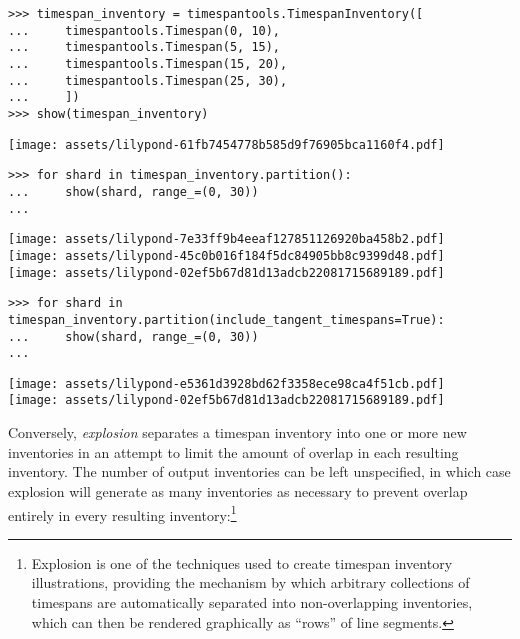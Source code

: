 \begin{abjadbookoutput}
\begin{singlespacing}
\vspace{-0.5\baselineskip}
\begin{lstlisting}
>>> timespan_inventory = timespantools.TimespanInventory([
...     timespantools.Timespan(0, 10),
...     timespantools.Timespan(5, 15),
...     timespantools.Timespan(15, 20),
...     timespantools.Timespan(25, 30),
...     ])
>>> show(timespan_inventory)
\end{lstlisting}
\noindent\texttt{[image: assets/lilypond-61fb7454778b585d9f76905bca1160f4.pdf]}
\begin{lstlisting}
>>> for shard in timespan_inventory.partition():
...     show(shard, range_=(0, 30))
...
\end{lstlisting}
\noindent\texttt{[image: assets/lilypond-7e33ff9b4eeaf127851126920ba458b2.pdf]}\\
\noindent\texttt{[image: assets/lilypond-45c0b016f184f5dc84905bb8c9399d48.pdf]}\\
\noindent\texttt{[image: assets/lilypond-02ef5b67d81d13adcb22081715689189.pdf]}
\begin{lstlisting}
>>> for shard in timespan_inventory.partition(include_tangent_timespans=True):
...     show(shard, range_=(0, 30))
...
\end{lstlisting}
\noindent\texttt{[image: assets/lilypond-e5361d3928bd62f3358ece98ca4f51cb.pdf]}\\
\noindent\texttt{[image: assets/lilypond-02ef5b67d81d13adcb22081715689189.pdf]}
\end{singlespacing}
\end{abjadbookoutput}

\noindent Conversely, \emph{explosion} separates a timespan inventory into one
or more new inventories in an attempt to limit the amount of overlap in each
resulting inventory. The number of output inventories can be left unspecified,
in which case explosion will generate as many inventories as necessary to
prevent overlap entirely in every resulting inventory:\footnote{ Explosion is
one of the techniques used to create timespan inventory illustrations,
providing the mechanism by which arbitrary collections of timespans are
automatically separated into non-overlapping inventories, which can then be
rendered graphically as \enquote{rows} of line segments.}

